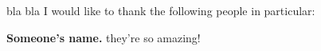 
 bla bla I would like to thank the following people in particular:

\textbf{Someone's name.} they're so amazing!
